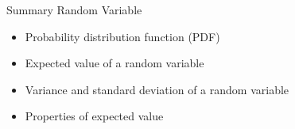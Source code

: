 \documentclass{beamer}
\newcommand{\ignore}[1]{}
\let\thefootnote\relax\footnotetext{\tiny{*  Office Hours: Wed \& Fri 10:00 - 11:30 AM, KMC 8-174}}
\begin{document}
\begin{frame}{Summary}
Random Variable
\begin{itemize}
\item Probability distribution function (PDF)
\item Expected value of a random variable
\item Variance and standard deviation of a random variable
\item Properties of expected value
\end{itemize}
\end{frame}
\ignore{
\begin{frame}{Time Series Plot}
\begin{figure}
    \caption{}
    \texttt{[image: figures/coindesk-bpi-chart]}
\end{figure}
\let\thefootnote\relax\footnotetext{\tiny{* Plot from Coindesk.com}}
\end{frame}

\begin{frame}{}
\begin{itemize}
\item 
\end{itemize}
\end{frame}

\vspace{\stretch{0.5}}

\begin{block}{}
\end{block}


}
\end{document}
